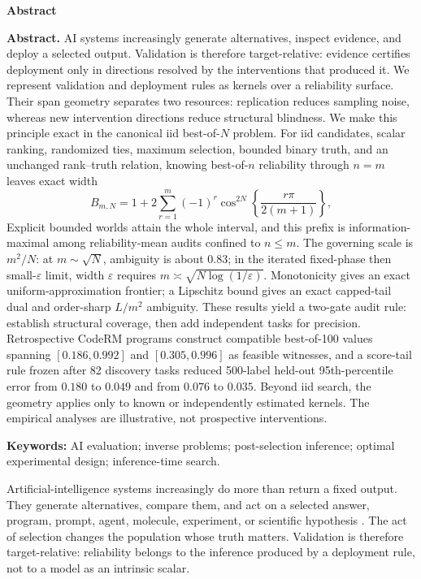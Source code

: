 \documentclass[10pt,twocolumn]{article}
\begin{document}
\begin{center}
{\large\bfseries Abstract}
\end{center}
\noindent\textbf{Abstract.}
AI systems increasingly generate alternatives, inspect evidence, and deploy a selected output. Validation is therefore target-relative: evidence certifies deployment only in directions resolved by the interventions that produced it. We represent validation and deployment rules as kernels over a reliability surface. Their span geometry separates two resources: replication reduces sampling noise, whereas new intervention directions reduce structural blindness. We make this principle exact in the canonical iid best-of-$N$ problem. For iid candidates, scalar ranking, randomized ties, maximum selection, bounded binary truth, and an unchanged rank--truth relation, knowing best-of-$n$ reliability through $n=m$ leaves exact width
\[
B_{m,N}=1+2\sum_{r=1}^{m}(-1)^r
\cos^{2N}\!\left\{\frac{r\pi}{2(m+1)}\right\},
\]
Explicit bounded worlds attain the whole interval, and this prefix is information-maximal among reliability-mean audits confined to $n\le m$. The governing scale is $m^2/N$: at $m\sim\sqrt N$, ambiguity is about $0.83$; in the iterated fixed-phase then small-$\varepsilon$ limit, width $\varepsilon$ requires $m\asymp\sqrt{N\log(1/\varepsilon)}$. Monotonicity gives an exact uniform-approximation frontier; a Lipschitz bound gives an exact capped-tail dual and order-sharp $L/m^2$ ambiguity. These results yield a two-gate audit rule: establish structural coverage, then add independent tasks for precision. Retrospective CodeRM programs construct compatible best-of-100 values spanning $[0.186,0.992]$ and $[0.305,0.996]$ as feasible witnesses, and a score-tail rule frozen after 82 discovery tasks reduced 500-label held-out 95th-percentile error from $0.180$ to $0.049$ and from $0.076$ to $0.035$. Beyond iid search, the geometry applies only to known or independently estimated kernels. The empirical analyses are illustrative, not prospective interventions.
\par\smallskip
\noindent\textbf{Keywords:} AI evaluation; inverse problems; post-selection inference; optimal experimental design; inference-time search.
\par\medskip

Artificial-intelligence systems increasingly do more than return a fixed output. They generate alternatives, compare them, and act on a selected answer, program, prompt, agent, molecule, experiment, or scientific hypothesis \citep{lu2024,gottweis2026,ellis2026}. The act of selection changes the population whose truth matters. Validation is therefore target-relative: reliability belongs to the inference produced by a deployment rule, not to a model as an intrinsic scalar.
\end{document}
